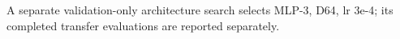A separate validation-only architecture search selects MLP-3, D64, lr 3e-4; its completed transfer evaluations are reported separately.
